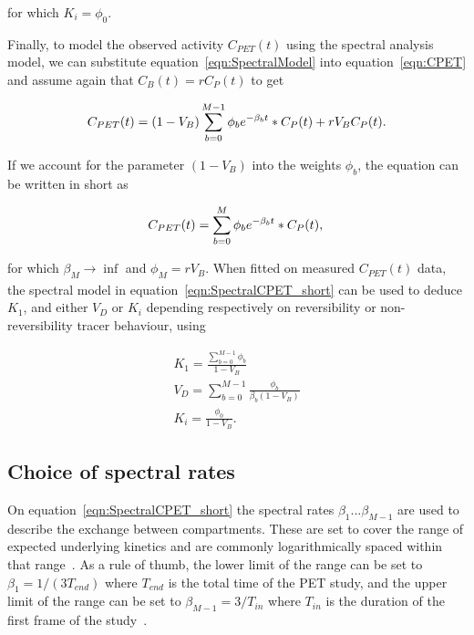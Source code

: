 for which $K_i = {\phi_0}$. 

Finally, to model the observed activity $C_{PET}(t)$ using the spectral analysis model, we can substitute equation~\ref{eqn:SpectralModel} into equation~\ref{eqn:CPET} and assume again that $C_{B}(t) = r C_{P}(t)$ to get

\begin{equation} 
{C_{PET}}(t)  = (1-V_{B}) \sum_{b=0}^{M-1} {\phi_b}  e^{-\beta_b t} \ast C_P(t) + r V_{B}  C_P(t)   \\ . \\
\label{eqn:SpectralCPET}
\end{equation}

If we account for the parameter $(1-V_{B})$ into the weights $\phi_b$, the equation can be written in short as 

\begin{equation} 
{C_{PET}}(t)  = \sum_{b=0}^{M} {\phi_b} e^{-\beta_b t} \ast C_P(t)   \\ , \\
\label{eqn:SpectralCPET_short}
\end{equation}

for which $\beta_M \xrightarrow[]{}\inf$ and $\phi_M = r V_{B}$. 
When fitted on measured ${C_{PET}}(t)$ data, the spectral model in equation~\ref{eqn:SpectralCPET_short} can be used to deduce $K_1$, and either $V_D$ or $K_i$ depending respectively on reversibility or non-reversibility tracer behaviour, using

\begin{subequations}
\label{eqn:AllSpectralEqns}
\begin{align}
K_1 = \frac{\sum_{b=0}^{M-1} {\phi_b}}{1-{V_{B}}}   \\  
V_D = \sum_{b=0}^{M-1} \frac {\phi_b}{\beta_b (1-V_{B})} \\
K_i = \frac{\phi_0}{1-V_{B}} .
\end{align}
\label{eqn:SpectralCPET_AllEquations}
\end{subequations}
%
\subsection{Choice of spectral rates}
%
On equation~\ref{eqn:SpectralCPET_short} the spectral rates $\beta_1 ... \beta_{M-1}$ are used to describe the exchange between compartments. These are set to cover the range of expected underlying kinetics and are commonly logarithmically spaced within that range~\cite{Gunn2002}.
As a rule of thumb, the lower limit of the range can be set to $\beta_1 = 1/(3 T_{end})$ where $T_{end}$ is the total time of the PET study, and the upper limit of the range can be set to $\beta_{M-1} = 3/T_{in}$ where $T_{in}$ is the duration of the first frame of the study~\cite{Veronese2016}.

